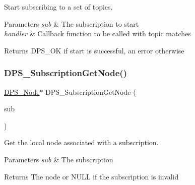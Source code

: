 Start subscribing to a set of topics. 


\begin{DoxyParams}{Parameters}
{\em sub} & The subscription to start \\
\hline
{\em handler} & Callback function to be called with topic matches\\
\hline
\end{DoxyParams}
\begin{DoxyReturn}{Returns}
D\+P\+S\+\_\+\+OK if start is successful, an error otherwise 
\end{DoxyReturn}
\mbox{\label{group__subscription_gafea65751c811555736c8c65fcb3a9480}} 
\subsubsection{\texorpdfstring{D\+P\+S\+\_\+\+Subscription\+Get\+Node()}{DPS\_SubscriptionGetNode()}}
{\footnotesize\ttfamily \hyperlink{group__node_ga4dd612ab965134321bb57fdb065f121c}{D\+P\+S\+\_\+\+Node}$\ast$ D\+P\+S\+\_\+\+Subscription\+Get\+Node (\begin{DoxyParamCaption}\item[{const \hyperlink{group__subscription_gadb927c4c1b7306867a75fc4288b54af7}{D\+P\+S\+\_\+\+Subscription} $\ast$}]{sub }\end{DoxyParamCaption})}



Get the local node associated with a subscription. 


\begin{DoxyParams}{Parameters}
{\em sub} & The subscription\\
\hline
\end{DoxyParams}
\begin{DoxyReturn}{Returns}
The node or N\+U\+LL if the subscription is invalid 
\end{DoxyReturn}
\mbox{\label{group__subscription_gab0ad2c6806f8f44f27c70fff915b7e9a}} 
